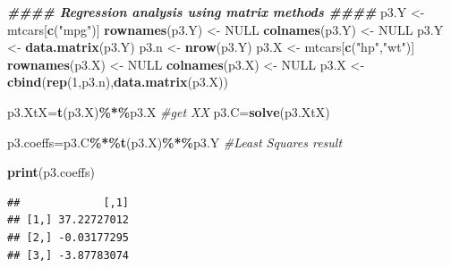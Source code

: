 \documentclass[
]{article}
\newenvironment{Shaded}{\begin{snugshade}}{\end{snugshade}}
\newcommand{\CommentTok}[1]{\textcolor[rgb]{0.56,0.35,0.01}{\textit{#1}}}
\newcommand{\ConstantTok}[1]{\textcolor[rgb]{0.56,0.35,0.01}{#1}}
\newcommand{\DecValTok}[1]{\textcolor[rgb]{0.00,0.00,0.81}{#1}}
\newcommand{\DocumentationTok}[1]{\textcolor[rgb]{0.56,0.35,0.01}{\textbf{\textit{#1}}}}
\newcommand{\FunctionTok}[1]{\textcolor[rgb]{0.13,0.29,0.53}{\textbf{#1}}}
\newcommand{\NormalTok}[1]{#1}
\newcommand{\OtherTok}[1]{\textcolor[rgb]{0.56,0.35,0.01}{#1}}
\newcommand{\SpecialCharTok}[1]{\textcolor[rgb]{0.81,0.36,0.00}{\textbf{#1}}}
\newcommand{\StringTok}[1]{\textcolor[rgb]{0.31,0.60,0.02}{#1}}
\begin{document}
\begin{Shaded}
\begin{Highlighting}[]
\DocumentationTok{\#\#\#\# Regression analysis using matrix methods \#\#\#\#}
\NormalTok{p3.Y }\OtherTok{\textless{}{-}}\NormalTok{ mtcars[}\FunctionTok{c}\NormalTok{(}\StringTok{"mpg"}\NormalTok{)]}
\FunctionTok{rownames}\NormalTok{(p3.Y) }\OtherTok{\textless{}{-}} \ConstantTok{NULL}
\FunctionTok{colnames}\NormalTok{(p3.Y) }\OtherTok{\textless{}{-}} \ConstantTok{NULL}
\NormalTok{p3.Y }\OtherTok{\textless{}{-}} \FunctionTok{data.matrix}\NormalTok{(p3.Y)}
\NormalTok{p3.n }\OtherTok{\textless{}{-}} \FunctionTok{nrow}\NormalTok{(p3.Y)}
\NormalTok{p3.X }\OtherTok{\textless{}{-}}\NormalTok{ mtcars[}\FunctionTok{c}\NormalTok{(}\StringTok{"hp"}\NormalTok{,}\StringTok{"wt"}\NormalTok{)]}
\FunctionTok{rownames}\NormalTok{(p3.X) }\OtherTok{\textless{}{-}} \ConstantTok{NULL}
\FunctionTok{colnames}\NormalTok{(p3.X) }\OtherTok{\textless{}{-}} \ConstantTok{NULL}
\NormalTok{p3.X }\OtherTok{\textless{}{-}} \FunctionTok{cbind}\NormalTok{(}\FunctionTok{rep}\NormalTok{(}\DecValTok{1}\NormalTok{,p3.n),}\FunctionTok{data.matrix}\NormalTok{(p3.X))}

\NormalTok{p3.XtX}\OtherTok{=}\FunctionTok{t}\NormalTok{(p3.X)}\SpecialCharTok{\%*\%}\NormalTok{p3.X       }\CommentTok{\#get X\textquotesingle{}X}
\NormalTok{p3.C}\OtherTok{=}\FunctionTok{solve}\NormalTok{(p3.XtX)}

\NormalTok{p3.coeffs}\OtherTok{=}\NormalTok{p3.C}\SpecialCharTok{\%*\%}\FunctionTok{t}\NormalTok{(p3.X)}\SpecialCharTok{\%*\%}\NormalTok{p3.Y }\CommentTok{\#Least Squares result}

\FunctionTok{print}\NormalTok{(p3.coeffs)}
\end{Highlighting}
\end{Shaded}

\begin{verbatim}
##             [,1]
## [1,] 37.22727012
## [2,] -0.03177295
## [3,] -3.87783074
\end{verbatim}
\end{document}
